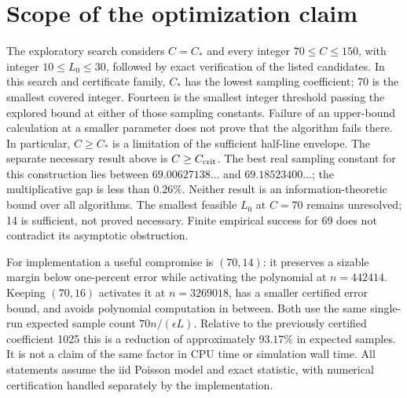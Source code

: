 \documentclass[10pt]{article}
\begin{document}
\section{Scope of the optimization claim}
The exploratory search considers $C=C_*$ and every integer $70\le C\le150$,
with integer $10\le L_0\le30$, followed by exact verification of the listed
candidates. In this search and certificate family, $C_*$ has the lowest
sampling coefficient; 70 is the smallest covered integer. Fourteen is the
smallest integer threshold passing the explored bound at either of those
sampling constants. Failure of an upper-bound calculation at a smaller
parameter does not prove that the algorithm fails there.
In particular, $C\ge C_*$ is a limitation of the sufficient half-line
envelope. The separate necessary result above is $C\ge C_{\rm crit}$.
The best real sampling constant for this construction lies between
$69.00627138\ldots$ and $69.18523400\ldots$; the multiplicative gap is
less than $0.26\%$. Neither result is an information-theoretic bound over
all algorithms. The smallest feasible $L_0$ at $C=70$ remains unresolved;
14 is sufficient, not proved necessary. Finite empirical success for 69
does not contradict its asymptotic obstruction.

For implementation a useful compromise is $(70,14)$: it preserves a sizable
margin below one-percent error while activating the polynomial at
$n=442414$. Keeping $(70,16)$ activates it at $n=3269018$, has a smaller
certified error bound, and avoids polynomial computation in between.
Both use the same single-run expected sample count $70n/(\epsilon L)$.
Relative to the previously certified coefficient 1025 this is a reduction
of approximately $93.17\%$ in expected samples. It is not a claim of
the same factor in CPU time or simulation wall time. All statements assume
the iid Poisson model and exact statistic, with numerical certification
handled separately by the implementation.
\end{document}
